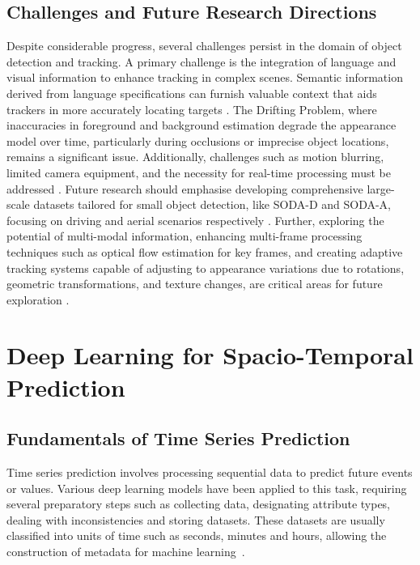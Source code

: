 \documentclass[12pt,oneside]{book} %
\begin{document}
\subsection{Challenges and Future Research Directions}
Despite considerable progress, several challenges persist in the domain of
object detection and tracking. A primary challenge is the integration of
language and visual information to enhance tracking in complex scenes. Semantic
information derived from language specifications can furnish valuable context
that aids trackers in more accurately locating targets \cite{SurveyVisualOT}.
The Drifting Problem, where inaccuracies in foreground and background
estimation degrade the appearance model over time, particularly during
occlusions or imprecise object locations, remains a significant issue.
Additionally, challenges such as motion blurring, limited camera equipment, and
the necessity for real-time processing must be addressed
\cite{OverviewCorrelationAlgoOT}. Future research should emphasise developing
comprehensive large-scale datasets tailored for small object detection, like
SODA-D and SODA-A, focusing on driving and aerial scenarios respectively
\cite{SurveySmallObjectDetection, SmallObjectDetectionPositonPrediction}.
Further, exploring the potential of multi-modal information, enhancing
multi-frame processing techniques such as optical flow estimation for key
frames, and creating adaptive tracking systems capable of adjusting to
appearance variations due to rotations, geometric transformations, and texture
changes, are critical areas for future exploration \cite{SurveyVisualOT,
    OverviewCorrelationAlgoOT, SmallObjectDetectionPositonPrediction,
    SuveyAdvancesSingleOTMethods, SurveyModernODModels,
    SurveyTransformersSingleOT}.

\section{Deep Learning for Spacio-Temporal Prediction}
\subsection{Fundamentals of Time Series Prediction}
Time series prediction involves processing sequential data to predict future
events or values. Various deep learning models have been applied to this task,
requiring several preparatory steps such as collecting data, designating
attribute types, dealing with inconsistencies and storing datasets. These
datasets are usually classified into units of time such as seconds, minutes and
hours, allowing the construction of metadata for machine
learning~\cite{FFPSpaceSystemVehicles}.
\end{document}
